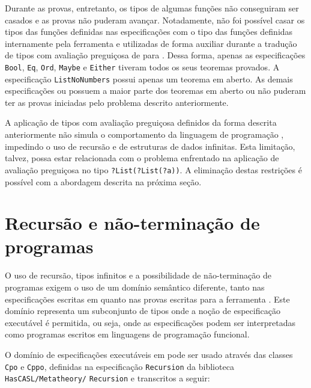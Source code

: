 Durante as provas, entretanto, os tipos de algumas funções não conseguiram ser casados e as provas não puderam avançar.
Notadamente, não foi possível casar os tipos das funções definidas nas especificações com o tipo das funções definidas internamente pela ferramenta \Hets e utilizadas de forma auxiliar durante a tradução de tipos com avaliação preguiçosa de \HasCASL para \HOL.
Dessa forma, apenas as especificações \Verb.Bool., \Verb.Eq., \Verb.Ord., \Verb.Maybe. e \Verb.Either. tiveram todos os seus teoremas provados.
A especificação \Verb.ListNoNumbers. possui apenas um teorema em aberto.
As demais especificações ou possuem a maior parte dos teoremas em aberto ou não puderam ter as provas iniciadas pelo problema descrito anteriormente.

A aplicação de tipos com avaliação preguiçosa definidos da forma descrita anteriormente não simula o comportamento da linguagem de programação \Haskell, impedindo o uso de recursão e de estruturas de dados infinitas.
Esta limitação, talvez, possa estar relacionada com o problema enfrentado na aplicação de avaliação preguiçosa no tipo \Verb.?List(?List(?a))..
A eliminação destas restrições é possível com a abordagem descrita na próxima seção.

\section{Recursão e não-terminação de programas}
O uso de recursão, tipos infinitos e a possibilidade de não-terminação de programas exigem o uso de um domínio semântico diferente, tanto nas especificações escritas em \HasCASL quanto nas provas escritas para a ferramenta \Isabelle.
Este domínio representa um subconjunto de tipos onde a noção de especificação executável é permitida, ou seja, onde as especificações podem ser interpretadas como programas escritos em linguagens de programação funcional.

O domínio de especificações executáveis em \HasCASL pode ser usado através das classes \Verb.Cpo. e \Verb.Cppo., definidas na especificação \Verb.Recursion. da biblioteca \Verb.HasCASL/Metatheory/. \Verb.Recursion. e transcritos a seguir:

